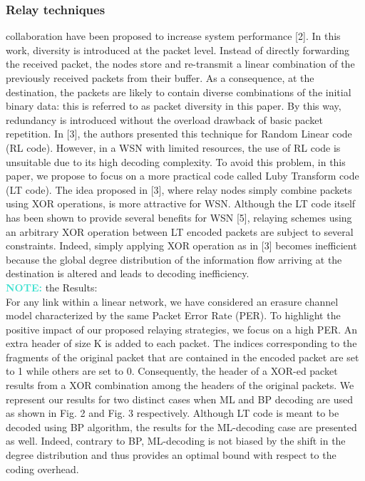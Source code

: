 \documentclass[12pt,a4paper,titlepage,twocolumn]{article}
\newcommand{\note}{\textcolor{Turquoise}{\textbf{NOTE: }}}
\begin{document}
\subsubsection{Relay techniques}
collaboration
have been proposed to increase system performance
[2]. In this work, diversity is introduced at the packet level.
Instead of directly forwarding the received packet, the nodes
store and re-transmit a linear combination of the previously
received packets from their buffer. As a consequence, at the
destination, the packets are likely to contain diverse combinations
of the initial binary data: this is referred to as packet
diversity in this paper. By this way, redundancy is introduced
without the overload drawback of basic packet repetition.
In [3], the authors presented this technique for Random
Linear code (RL code). However, in a WSN with limited
resources, the use of RL code is unsuitable due to its high
decoding complexity. To avoid this problem, in this paper,
we propose to focus on a more practical code called Luby
Transform code (LT code). The idea proposed in [3], where relay nodes simply combine
packets using XOR operations, is more attractive for WSN.
Although the LT code itself has been shown to provide
several benefits for WSN [5], relaying schemes using an
arbitrary XOR operation between LT encoded packets are
subject to several constraints. Indeed, simply applying XOR
operation as in [3] becomes inefficient because the global
degree distribution of the information flow arriving at the
destination is altered and leads to decoding inefficiency.\\
\note{the Results:}\\
For any link within a linear network, we have considered an
erasure channel model characterized by the same Packet Error Rate (PER). To highlight the positive impact of our proposed
relaying strategies, we focus on a high PER. An extra header
of size K is added to each packet. The indices corresponding
to the fragments of the original packet that are contained in
the encoded packet are set to 1 while others are set to 0.
Consequently, the header of a XOR-ed packet results from a
XOR combination among the headers of the original packets.
We represent our results for two distinct cases when ML
and BP decoding are used as shown in Fig. 2 and Fig.
3 respectively. Although LT code is meant to be decoded
using BP algorithm, the results for the ML-decoding case are
presented as well. Indeed, contrary to BP, ML-decoding is not
biased by the shift in the degree distribution and thus provides
an optimal bound with respect to the coding overhead.
\end{document}
